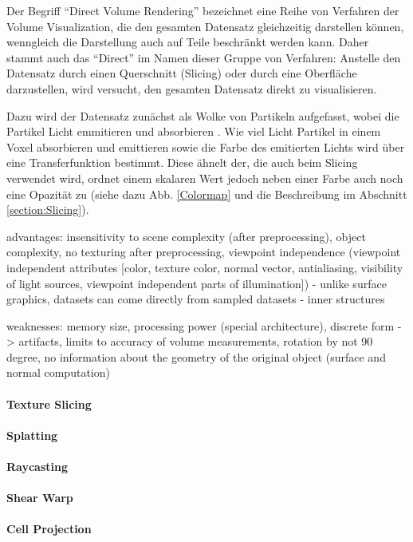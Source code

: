 \documentclass[a4paper,fontsize=12pt,toc=bib,halfparskip]{scrartcl}
\begin{document}
Der Begriff ``Direct Volume Rendering'' bezeichnet eine Reihe von Verfahren der Volume Visualization, die den gesamten Datensatz gleichzeitig darstellen k\"onnen, wenngleich die Darstellung auch auf Teile beschr\"ankt werden kann. Daher stammt auch das ``Direct'' im Namen dieser Gruppe von Verfahren: Anstelle den Datensatz durch einen Querschnitt (Slicing) oder durch eine Oberfl\"ache darzustellen, wird versucht, den gesamten Datensatz direkt zu visualisieren.

Dazu wird der Datensatz zun\"achst als Wolke von Partikeln aufgefasst, wobei die Partikel Licht emmitieren und absorbieren \cite[s.~134f]{kaufman2005overview}. Wie viel Licht Partikel in einem Voxel absorbieren und emittieren sowie die Farbe des emitierten Lichts wird \"uber eine Transferfunktion bestimmt. Diese \"ahnelt der, die auch beim Slicing verwendet wird, ordnet einem skalaren Wert jedoch neben einer Farbe auch noch eine Opazit\"at zu (siehe dazu Abb. \ref{Colormap} und die Beschreibung im Abschnitt \ref{section:Slicing}).  


advantages: insensitivity to scene complexity (after preprocessing), object complexity,
no texturing after preprocessing, viewpoint independence (viewpoint independent attributes [color, texture color,
normal vector, antialiasing, visibility of light sources, viewpoint independent parts of illumination])
- unlike surface graphics, datasets can come directly from sampled datasets
- inner structures


weaknesses: memory size, processing power (special architecture), discrete form -> artifacts, limits to accuracy of
volume measurements, rotation by not 90 degree, no information about the geometry of the original object (surface
and normal computation)

\paragraph{Texture Slicing}
\paragraph{Splatting}
\paragraph{Raycasting}
\paragraph{Shear Warp}
\paragraph{Cell Projection}
\end{document}
